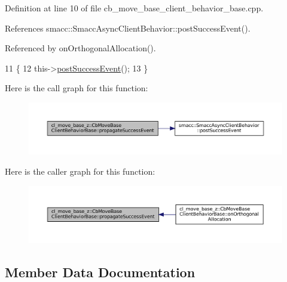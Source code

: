 Definition at line 10 of file cb\+\_\+move\+\_\+base\+\_\+client\+\_\+behavior\+\_\+base.\+cpp.



References smacc\+::\+Smacc\+Async\+Client\+Behavior\+::post\+Success\+Event().



Referenced by on\+Orthogonal\+Allocation().


\begin{DoxyCode}
11 \{
12   this->\hyperlink{classsmacc_1_1SmaccAsyncClientBehavior_adf18efe1f0e4eacc1277b8865a8a94b1}{postSuccessEvent}();
13 \}
\end{DoxyCode}
Here is the call graph for this function\+:
\nopagebreak
\begin{figure}[H]
\begin{center}
\leavevmode
\includegraphics[width=350pt]{classcl__move__base__z_1_1CbMoveBaseClientBehaviorBase_a12109fd9132a93140e4f022ee052e2ed_cgraph}
\end{center}
\end{figure}
Here is the caller graph for this function\+:
\nopagebreak
\begin{figure}[H]
\begin{center}
\leavevmode
\includegraphics[width=350pt]{classcl__move__base__z_1_1CbMoveBaseClientBehaviorBase_a12109fd9132a93140e4f022ee052e2ed_icgraph}
\end{center}
\end{figure}


\subsection{Member Data Documentation}
\mbox{\label{classcl__move__base__z_1_1CbMoveBaseClientBehaviorBase_ab2ef219464cfac8659b4a87c8d0db6d5}} 
